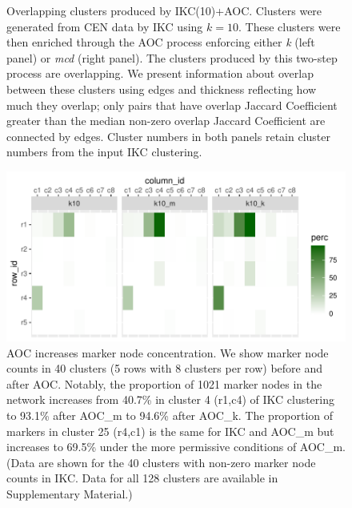 \documentclass[11pt, oneside]{article}   	%
\begin{document}
\begin{figure}[H]
\begin{subfigure}[t]{0.48\textwidth}
    	\end{subfigure}
\caption{Overlapping clusters produced by IKC(10)+AOC.  Clusters were generated from CEN data by IKC using $k=10$. These clusters were then enriched through the AOC process enforcing either \emph{k} (left panel) or \emph{mcd} (right panel). 
The clusters produced  by this two-step process are overlapping. We present information about overlap between these clusters using edges and thickness reflecting how much they overlap; only pairs that have overlap Jaccard Coefficient greater  than the median  non-zero overlap Jaccard Coefficient are connected by edges. 
Cluster numbers in both panels retain cluster numbers from the input IKC clustering.}
\label{fig:fig3}
\end{figure}

\begin{figure}[H]
	\centering
	 \includegraphics[width=0.7\linewidth]{marker_comps_wide.pdf} 
\caption{AOC increases marker node concentration. We show marker node counts in 40 clusters (5 rows with 8 clusters per row) before and after AOC.  Notably, the proportion of 1021 marker nodes in the network increases from 40.7\% in cluster 4 (r1,c4) of IKC clustering to 93.1\% after AOC\_m to 94.6\% after AOC\_k. The proportion of markers in cluster 25 (r4,c1) is the same for IKC and AOC\_m but increases to  69.5\% under the more permissive conditions of AOC\_m. (Data are shown for the 40 clusters with non-zero marker node counts in IKC. Data for all 128 clusters are available in Supplementary Material.)}
\label{fig:fig4}
\end{figure}
\end{document}
